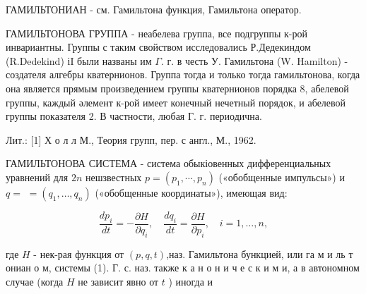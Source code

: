 \documentclass[10pt]{article}
\begin{document}
ГАМИЛЬТОНИАН - см. Гамильтона функция, Гамильтона оператор.



ГАМИЛЬТОНОВА ГРУППА - неабелева группа, все подгруппы к-рой инвариантны. Группы с таким свойством исследовались Р.Дедекиндом (R.Dedekind) іI были названы им $\Gamma$. г. в честь У. Гамильтона (W. Hamilton) - создателя алгебры кватернионов. Группа тогда и только тогда гамильтонова, когда она является прямым произведением группы кватернионов порядка 8, абелевой группы, каждый әлемент к-рой имеет конечный нечетный порядок, и абелевой группы показателя 2. В частности, любая Г. г. периодична.



Лит.: [1] Х о л л М., Теория групп, пер. с англ., М., 1962.



ГАМИЛЬТОНОВА СИСТЕМА - система обыкіовенных дифференциальных уравнений для $2 n$ нешзвестных $p=\left(p_{1}, \cdots, p_{n}\right)$ («обобщенные импульсы») и $q=$ $=\left(q_{1}, \ldots, q_{n}\right)$ («обобщенные координаты»), имеющая вид:



\[

\frac{d p_{i}}{d t}=-\frac{\partial H}{\partial q_{i}}, \quad \frac{d q_{i}}{d t}=\frac{\partial H}{\partial p_{i}}, \quad i=1, \ldots, n,

\]



где $H$ - нек-рая функция от $(p, q, t)$,наз. Гамильтона бункцией, или га м и ль т ониан о м, системы (1). Г. с. наз. также к а н о н и ч е с к и м и, а в автономном случае (когда $H$ не зависит явно от $t$ ) иногда и
\end{document}
